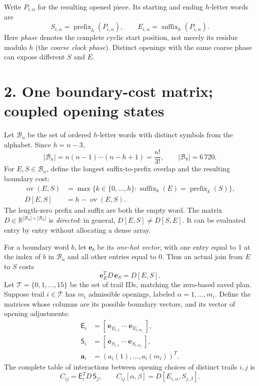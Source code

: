 \documentclass[11pt]{article}
\begin{document}
Write \(P_{i,\alpha}\) for the resulting opened piece. Its starting and
ending \(h\)-letter words are
\[
S_{i,\alpha}=\operatorname{prefix}_h(P_{i,\alpha}),
\qquad
E_{i,\alpha}=\operatorname{suffix}_h(P_{i,\alpha}).
\]
Here \emph{phase} denotes the complete cyclic start position, not merely
its residue modulo \(h\) (the \emph{coarse clock phase}). Distinct openings
with the same coarse phase can expose different \(S\) and \(E\).

\section*{2. One boundary-cost matrix; coupled opening states}
Let \(\mathcal B_n\) be the set of ordered \(h\)-letter words with distinct
symbols from the alphabet. Since \(h=n-3\),
\[
|\mathcal B_n|=n(n-1)\cdots(n-h+1)=\frac{n!}{3!},
\qquad |\mathcal B_8|=6\,720.
\]
For \(E,S\in\mathcal B_n\), define the longest suffix-to-prefix overlap
and the resulting boundary cost:
\[
\begin{aligned}
\operatorname{ov}(E,S)
 &=\max\bigl\{k\in\{0,\ldots,h\}:
 \operatorname{suffix}_k(E)=\operatorname{prefix}_k(S)\bigr\},\\
D[E,S]&=h-\operatorname{ov}(E,S).
\end{aligned}
\]
The length-zero prefix and suffix are both the empty word. The matrix
\(D\in\mathbb R^{|\mathcal B_n|\times|\mathcal B_n|}\) is \emph{directed}:
in general, \(D[E,S]\neq D[S,E]\). It can be evaluated entry by entry
without allocating a dense array.

For a boundary word \(b\), let \(\mathbf e_b\) be its \emph{one-hot vector},
with one entry equal to 1 at the index of \(b\) in \(\mathcal B_n\) and all
other entries equal to 0. Thus an actual join from \(E\) to \(S\) costs
\[
\mathbf e_E^T D\,\mathbf e_S=D[E,S].
\]
Let \(\mathcal T=\{0,1,\ldots,15\}\) be the set of trail IDs,
matching the zero-based saved plan. Suppose trail \(i\in\mathcal T\)
has \(m_i\) admissible openings, labeled
\(\alpha=1,\ldots,m_i\). Define the matrices whose columns are its
possible boundary vectors, and its vector of opening adjustments:
\[
\begin{aligned}
\mathsf E_i&=
 [\,\mathbf e_{E_{i,1}}\ \cdots\ \mathbf e_{E_{i,m_i}}\,],\\
\mathsf S_i&=
 [\,\mathbf e_{S_{i,1}}\ \cdots\ \mathbf e_{S_{i,m_i}}\,],\\
\mathbf a_i&=(a_i(1),\ldots,a_i(m_i))^T.
\end{aligned}
\]
The complete table of interactions between opening choices of distinct
trails \(i,j\) is
\[
\boxed{C_{ij}=\mathsf E_i^T D\,\mathsf S_j},
\qquad
C_{ij}[\alpha,\beta]
=D[E_{i,\alpha},S_{j,\beta}].
\]
\end{document}
